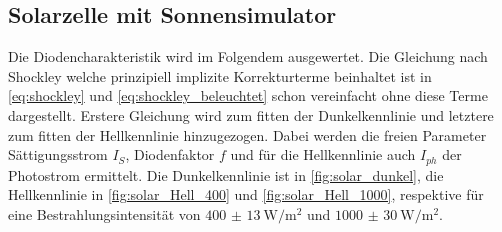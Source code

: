 \documentclass[english, ngerman]{scrartcl}
\begin{document}
\subsection{Solarzelle mit Sonnensimulator}
\label{subsec:auswertung_solar_sonnensimulator}
Die Diodencharakteristik wird im Folgendem ausgewertet. Die Gleichung nach Shockley welche prinzipiell implizite Korrekturterme beinhaltet ist in \autoref{eq:shockley} und \autoref{eq:shockley_beleuchtet} schon vereinfacht ohne diese Terme dargestellt. Erstere Gleichung wird zum fitten der Dunkelkennlinie und letztere zum fitten der Hellkennlinie hinzugezogen. Dabei werden die freien Parameter Sättigungsstrom $I_S$, Diodenfaktor $f$ und für die Hellkennlinie auch $I_{ph}$ der Photostrom ermittelt. Die Dunkelkennlinie ist in \autoref{fig:solar_dunkel}, die Hellkennlinie in \autoref{fig:solar_Hell_400} und \autoref{fig:solar_Hell_1000}, respektive für eine Bestrahlungsintensität von $\SI{400(13)}{\watt\per\meter\squared}$ und $\SI{1000(30)}{\watt\per\meter\squared}$.
\setcapindent{0pt}
\end{document}
